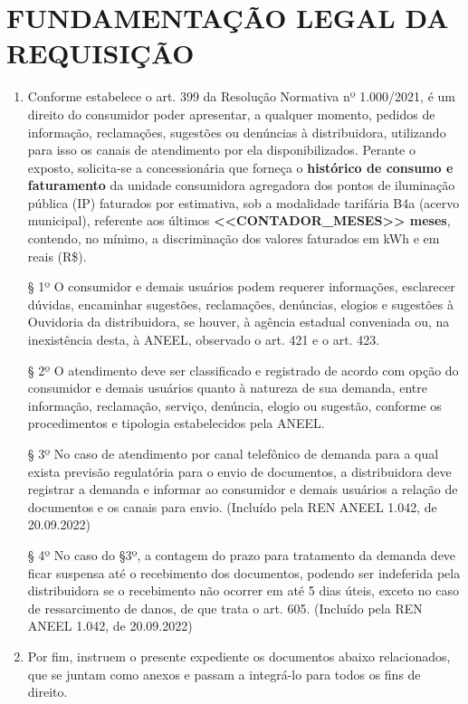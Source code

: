 \newcommand{\tipoRequerimento}{Solicitação de Histórico de Consumo e Faturamento}
\newcommand{\usaIPEstimada}{1}

\section{FUNDAMENTAÇÃO LEGAL DA REQUISIÇÃO}

\begin{enumerate}[resume]
  \item Conforme estabelece o art. 399 da Resolução Normativa nº 1.000/2021, é um direito do consumidor poder apresentar, a qualquer momento, pedidos de informação, reclamações, sugestões ou denúncias à distribuidora, utilizando para isso os canais de atendimento por ela disponibilizados.
Perante o exposto, solicita-se a concessionária que forneça o \textbf{histórico de consumo e faturamento} da unidade consumidora agregadora dos pontos de iluminação pública (IP) faturados por estimativa, sob a modalidade tarifária B4a (acervo municipal), referente aos últimos \textbf{<<CONTADOR_MESES>> meses}, contendo, no mínimo, a discriminação dos valores faturados em kWh e em reais (R\$).

  § 1º O consumidor e demais usuários podem requerer informações, esclarecer dúvidas, encaminhar sugestões, reclamações, denúncias, elogios e sugestões à Ouvidoria da distribuidora, se houver, à agência estadual conveniada ou, na inexistência desta, à ANEEL, observado o art. 421 e o art. 423.

  § 2º O atendimento deve ser classificado e registrado de acordo com opção do consumidor e demais usuários quanto à natureza de sua demanda, entre informação, reclamação, serviço, denúncia, elogio ou sugestão, conforme os procedimentos e tipologia estabelecidos pela ANEEL.

  § 3º No caso de atendimento por canal telefônico de demanda para a qual exista previsão regulatória para o envio de documentos, a distribuidora deve registrar a demanda e informar ao consumidor e demais usuários a relação de documentos e os canais para envio. (Incluído pela REN ANEEL 1.042, de 20.09.2022)

  § 4º No caso do §3º, a contagem do prazo para tratamento da demanda deve ficar suspensa até o recebimento dos documentos, podendo ser indeferida pela distribuidora se o recebimento não ocorrer em até 5 dias úteis, exceto no caso de ressarcimento de danos, de que trata o art. 605. (Incluído pela REN ANEEL 1.042, de 20.09.2022)
  
  \item Por fim, instruem o presente expediente os documentos abaixo relacionados, que se juntam como anexos e passam a integrá-lo para todos os fins de direito.
\end{enumerate}

